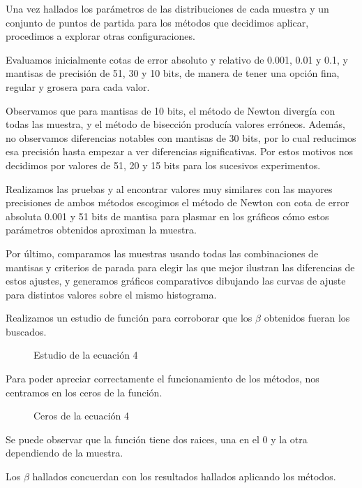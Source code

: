 \documentclass[a4paper,10pt,twoside]{article}
\begin{document}
Una vez hallados los parámetros de las distribuciones de cada muestra y un
conjunto de puntos de partida para los métodos que decidimos aplicar,
procedimos a explorar otras configuraciones. 

Evaluamos inicialmente cotas de error absoluto y relativo de 0.001, 0.01 y 0.1, y mantisas
de precisión de 51, 30 y 10 bits, de manera de tener una opción fina, regular y
grosera para cada valor.

Observamos que para mantisas de 10 bits, el método de Newton divergía con todas
las muestra, y el método de bisección producía valores erróneos. Además,
no observamos diferencias notables con mantisas de 30 bits, por lo cual reducimos
esa precisión hasta empezar a ver diferencias significativas. Por estos motivos
nos decidimos por valores de 51, 20 y 15 bits para los sucesivos experimentos.

Realizamos las pruebas y al encontrar valores muy similares con las mayores precisiones
de ambos métodos escogimos el método de Newton con cota de error absoluta 0.001 y 51 bits de mantisa
para plasmar en los gráficos cómo estos parámetros obtenidos aproximan la muestra.

Por último, comparamos las muestras usando todas las combinaciones de mantisas y criterios
de parada para elegir las que mejor ilustran las diferencias de estos ajustes, y
generamos gráficos comparativos dibujando las curvas de ajuste para distintos valores
sobre el mismo histograma.

Realizamos un estudio de función para corroborar que los $\beta$ obtenidos fueran los buscados.

\begin{figure}[H]
  \centering
  \caption{Estudio de la ecuación 4}
  
\end{figure}

Para poder apreciar correctamente el funcionamiento de los métodos, nos centramos en los ceros de la función.

\begin{figure}[H]
  \centering
  \caption{Ceros de la ecuación 4}
  
\end{figure}
Se puede observar que la función tiene dos raices, una en el 0 y la otra dependiendo de la muestra. 

Los $\beta$ hallados concuerdan con los resultados hallados aplicando los métodos.
\end{document}
